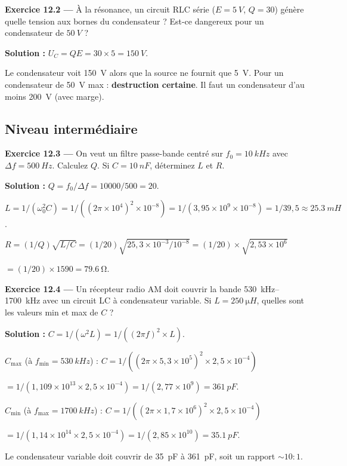 \documentclass[12pt,a4paper,twoside]{book}
\begin{document}
\textbf{Exercice 12.2 ---} À la résonance, un circuit RLC série ($E = \SI{5}{V}$, $Q = 30$) génère quelle tension aux bornes du condensateur ? Est-ce dangereux pour un condensateur de $\SI{50}{V}$ ?

\begin{pratique}
\textbf{Solution :} $U_C = QE = 30\times5 = \SI{150}{V}$.

Le condensateur voit \SI{150}{V} alors que la source ne fournit que \SI{5}{V}. Pour un condensateur de \SI{50}{V} max : \textbf{destruction certaine}. Il faut un condensateur d'au moins \SI{200}{V} (avec marge).
\end{pratique}

\subsection*{Niveau intermédiaire}

\textbf{Exercice 12.3 ---} On veut un filtre passe-bande centré sur $f_0 = \SI{10}{kHz}$ avec $\Delta f = \SI{500}{Hz}$. Calculez $Q$. Si $C = \SI{10}{nF}$, déterminez $L$ et $R$.

\begin{pratique}
\textbf{Solution :} $Q = f_0/\Delta f = 10000/500 = 20$.

$L = 1/(\omega_0^2 C) = 1/((2\pi\times10^4)^2\times10^{-8}) = 1/(3{,}95\times10^{9}\times10^{-8}) = 1/39{,}5 \approx \SI{25.3}{mH}$.

$R = (1/Q)\sqrt{L/C} = (1/20)\sqrt{25{,}3\times10^{-3}/10^{-8}} = (1/20)\times\sqrt{2{,}53\times10^6}$

$= (1/20)\times1590 = \SI{79.6}{\ohm}$.
\end{pratique}

\textbf{Exercice 12.4 ---} Un récepteur radio AM doit couvrir la bande \SI{530}{kHz}--\SI{1700}{kHz} avec un circuit LC à condensateur variable. Si $L = \SI{250}{\micro H}$, quelles sont les valeurs min et max de $C$ ?

\begin{pratique}
\textbf{Solution :} $C = 1/(\omega^2 L) = 1/((2\pi f)^2 \times L)$.

$C_{\max}$ (à $f_{\min} = \SI{530}{kHz}$) : $C = 1/((2\pi\times5{,}3\times10^5)^2\times2{,}5\times10^{-4})$

$= 1/(1{,}109\times10^{13}\times2{,}5\times10^{-4}) = 1/(2{,}77\times10^9) = \SI{361}{pF}$.

$C_{\min}$ (à $f_{\max} = \SI{1700}{kHz}$) : $C = 1/((2\pi\times1{,}7\times10^6)^2\times2{,}5\times10^{-4})$

$= 1/(1{,}14\times10^{14}\times2{,}5\times10^{-4}) = 1/(2{,}85\times10^{10}) = \SI{35.1}{pF}$.

Le condensateur variable doit couvrir de \SI{35}{pF} à \SI{361}{pF}, soit un rapport $\sim 10:1$.
\end{pratique}
\end{document}
